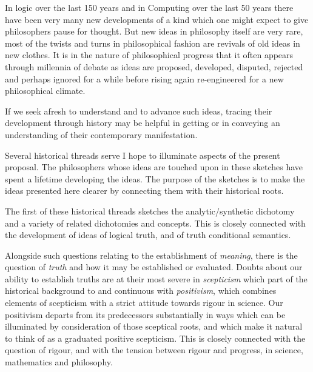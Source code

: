 In logic over the last 150 years and in Computing over the last 50
years there have been very many new developments of a kind which one
might expect to give philosophers pause for thought.
But new ideas in philosophy itself are very rare, most of the twists
and turns in philosophical fashion are revivals of old ideas in new
clothes.
It is in the nature of philosophical progress that it often appears
through millennia of debate as ideas are proposed, developed, disputed,
rejected and perhaps ignored for a while before rising again
re-engineered for a new philosophical climate.

If we seek afresh to understand and to advance such ideas, tracing
their development through history may be helpful in getting or in
conveying an understanding of their contemporary manifestation.

Several historical threads serve I hope to illuminate aspects of the
present proposal.
The philosophers whose ideas are touched upon in these sketches have
spent a lifetime developing the ideas.
The purpose of the sketches is to make the ideas presented here
clearer by connecting them with their historical roots.

The first of these historical threads sketches the analytic/synthetic
dichotomy and a variety of related dichotomies and concepts.
This is closely connected with the development of ideas of logical
truth, and of truth conditional semantics.

Alongside such questions relating to the establishment of
\emph{meaning}, there is the question of \emph{truth} and how it may
be established or evaluated.
Doubts about our ability to establish truths are at their most severe
in \emph{scepticism} which part of the historical background to and
continuous with \emph{positivism}, which combines elements of
scepticism with a strict attitude towards rigour in science.
Our positivism departs from its predecessors substantially in ways
which can be illuminated by consideration of those sceptical roots,
and which make it natural to think of as a graduated positive
scepticism.
This is closely connected with the question of rigour, and with the
tension between rigour and progress, in science, mathematics and
philosophy.

